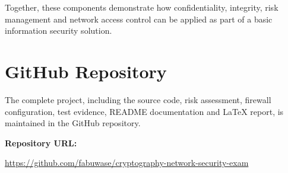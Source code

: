\documentclass[12pt,a4paper]{article}
\begin{document}
Together, these components demonstrate how confidentiality, integrity,
risk management and network access control can be applied as part of a
basic information security solution.

\section{GitHub Repository}

The complete project, including the source code, risk assessment,
firewall configuration, test evidence, README documentation and LaTeX
report, is maintained in the GitHub repository.

\textbf{Repository URL:}

\url{https://github.com/fabuwase/cryptography-network-security-exam}
\end{document}
